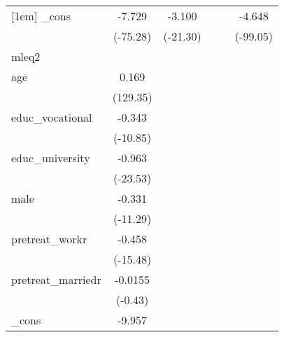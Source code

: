 {\begin{tabular}{l*{5}{c}}
[1em]
\_cons      &      -7.729\sym{***}&      -3.100\sym{***}&                     &                     &      -4.648\sym{***}\\
            &    (-75.28)         &    (-21.30)         &                     &                     &    (-99.05)         \\
\hline
mleq2       &                     &                     &                     &                     &                     \\
age         &       0.169\sym{***}&                     &                     &                     &                     \\
            &    (129.35)         &                     &                     &                     &                     \\
[1em]
educ\_vocational&      -0.343\sym{***}&                     &                     &                     &                     \\
            &    (-10.85)         &                     &                     &                     &                     \\
[1em]
educ\_university&      -0.963\sym{***}&                     &                     &                     &                     \\
            &    (-23.53)         &                     &                     &                     &                     \\
[1em]
male        &      -0.331\sym{***}&                     &                     &                     &                     \\
            &    (-11.29)         &                     &                     &                     &                     \\
[1em]
pretreat\_workr&      -0.458\sym{***}&                     &                     &                     &                     \\
            &    (-15.48)         &                     &                     &                     &                     \\
[1em]
pretreat\_marriedr&     -0.0155         &                     &                     &                     &                     \\
            &     (-0.43)         &                     &                     &                     &                     \\
[1em]
\_cons      &      -9.957\sym{***}&                     &                     &                     &                     \\

\end{tabular}}
